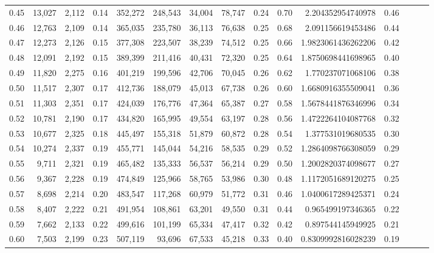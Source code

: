 \begin{tabular}{rrrrrrrrrrrrrrr}
0.45 &  13,027 &  2,112 &  0.14 &  352,272 &  248,543 &   34,004 &   78,747 &  0.24 &  0.70 &      2.204352954740978 &      0.46 \\
0.46 &  12,763 &  2,109 &  0.14 &  365,035 &  235,780 &   36,113 &   76,638 &  0.25 &  0.68 &      2.091156619453486 &      0.44 \\
0.47 &  12,273 &  2,126 &  0.15 &  377,308 &  223,507 &   38,239 &   74,512 &  0.25 &  0.66 &     1.9823061436262206 &      0.42 \\
0.48 &  12,091 &  2,192 &  0.15 &  389,399 &  211,416 &   40,431 &   72,320 &  0.25 &  0.64 &     1.8750698441698965 &      0.40 \\
0.49 &  11,820 &  2,275 &  0.16 &  401,219 &  199,596 &   42,706 &   70,045 &  0.26 &  0.62 &      1.770237071068106 &      0.38 \\
0.50 &  11,517 &  2,307 &  0.17 &  412,736 &  188,079 &   45,013 &   67,738 &  0.26 &  0.60 &     1.6680916355509041 &      0.36 \\
0.51 &  11,303 &  2,351 &  0.17 &  424,039 &  176,776 &   47,364 &   65,387 &  0.27 &  0.58 &     1.5678441876346996 &      0.34 \\
0.52 &  10,781 &  2,190 &  0.17 &  434,820 &  165,995 &   49,554 &   63,197 &  0.28 &  0.56 &     1.4722264104087768 &      0.32 \\
0.53 &  10,677 &  2,325 &  0.18 &  445,497 &  155,318 &   51,879 &   60,872 &  0.28 &  0.54 &      1.377531019680535 &      0.30 \\
0.54 &  10,274 &  2,337 &  0.19 &  455,771 &  145,044 &   54,216 &   58,535 &  0.29 &  0.52 &     1.2864098766308059 &      0.29 \\
0.55 &   9,711 &  2,321 &  0.19 &  465,482 &  135,333 &   56,537 &   56,214 &  0.29 &  0.50 &     1.2002820374098677 &      0.27 \\
0.56 &   9,367 &  2,228 &  0.19 &  474,849 &  125,966 &   58,765 &   53,986 &  0.30 &  0.48 &     1.1172051689120275 &      0.25 \\
0.57 &   8,698 &  2,214 &  0.20 &  483,547 &  117,268 &   60,979 &   51,772 &  0.31 &  0.46 &     1.0400617289425371 &      0.24 \\
0.58 &   8,407 &  2,222 &  0.21 &  491,954 &  108,861 &   63,201 &   49,550 &  0.31 &  0.44 &      0.965499197346365 &      0.22 \\
0.59 &   7,662 &  2,133 &  0.22 &  499,616 &  101,199 &   65,334 &   47,417 &  0.32 &  0.42 &      0.897544145949925 &      0.21 \\
0.60 &   7,503 &  2,199 &  0.23 &  507,119 &   93,696 &   67,533 &   45,218 &  0.33 &  0.40 &     0.8309992816028239 &      0.19 \\

\end{tabular}
